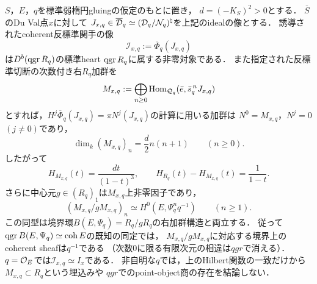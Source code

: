 \begin{theorem}
\label{thm:duval-point-hilbert}
$S$，$E$，$q$を標準弱楕円gluingの仮定のもとに置き，
$d=(-K_S)^2>0$とする．
$\overline S$のDu Val点$x$に対して
$J_{x,q}\in\overline{\mathcal D}_q\simeq
 (\mathcal D_q/\mathcal N_q)^\natural$を上記のidealの像とする．
誘導されたcoherent反標準関手の像
\[
 \mathcal I_{x,q}:=\overline\Phi_q(J_{x,q})
\]
は$D^b(\operatorname{qgr} R_q)$の標準heart $\operatorname{qgr} R_q$に属する非零対象である．
また指定された反標準切断の次数付き右$R_q$加群を
\[
 M_{x,q}:=\bigoplus_{n\ge0}
  \operatorname{Hom}_{\mathcal Q_q}(\bar e,\bar s_q^{\,n}J_{x,q})
\]
とすれば，$H^j\overline\Phi_q(J_{x,q})=
 \pi N^j(J_{x,q})$の計算に用いる加群は
$N^0=M_{x,q}$，$N^j=0$ $(j\ne0)$であり，
\[
 \boxed{\dim_k(M_{x,q})_n=\frac d2n(n+1)\qquad(n\ge0).}
\]
したがって
\[
 H_{M_{x,q}}(t)=\frac{dt}{(1-t)^3},\qquad
 H_{R_q}(t)-H_{M_{x,q}}(t)=\frac1{1-t}.
\]
さらに中心元$g\in(R_q)_1$は$M_{x,q}$上非零因子であり，
\[
 \boxed{(M_{x,q}/gM_{x,q})_n
 \simeq H^0(E,\Psi_q^nq^{-1})\qquad(n\ge1).}
\]
この同型は境界環$B(E,\Psi_q)=R_q/gR_q$の右加群構造と両立する．
従って$\operatorname{qgr} B(E,\Psi_q)\simeq\operatorname{coh} E$の既知の同定\cite{AVdBTHCR}では，
$M_{x,q}/gM_{x,q}$に対応する境界上のcoherent sheafは$q^{-1}$である
（次数$0$に限る有限次元の相違は$qgr$で消える）．
$q=\mathcal O_E$では$\mathcal I_{x,q}\simeq I_x$である．
非自明な$q$では，上のHilbert関数の一致だけから
$M_{x,q}\subset R_q$という埋込みや
$qgr$でのpoint-object商の存在を結論しない．
\end{theorem}
